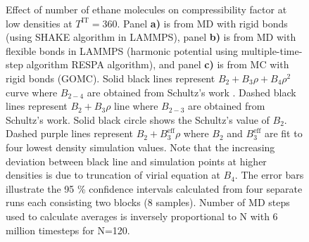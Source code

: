 \documentclass[5p,times]{elsarticle}
\begin{document}
\begin{figure}
\caption{ Effect of number of ethane molecules on compressibility factor at low densities at $T^{\mathrm{IT}}=360$. Panel \textbf{a)} is from MD with rigid bonds (using SHAKE algorithm \cite{Ryckaert1977} in LAMMPS), panel \textbf{b)} is from MD with flexible bonds in LAMMPS (harmonic potential using multiple-time-step algorithm RESPA \cite{tuckerman1992} algorithm), and panel \textbf{c)} is from MC with rigid bonds (GOMC). 
Solid black lines represent $B_2+B_3 \rho+B_4 \rho^2$ curve where $B_{2-4}$ are obtained from Schultz's work \cite{Schultz2010a}. Dashed black lines represent $B_2+B_3 \rho$ line where $B_{2-3}$ are obtained from Schultz's work. Solid black circle shows the Schultz's value of $B_2$. Dashed purple lines represent $B_2+B_3^\mathrm{eff}\rho$ where $B_2$ and $B_3^\mathrm{eff}$ are fit to four lowest density simulation values. Note that the increasing  deviation between black line and simulation points at higher densities is due to truncation of virial equation at $B_4$. The error bars illustrate the 95 \% confidence intervals calculated from four separate runs each consisting two blocks (8 samples). Number of MD steps used to calculate averages is inversely proportional to N with 6 million timesteps for N=120.
}
\label{fig:FSE_TraPPE_C2_abc}
\end{figure}
\end{document}
